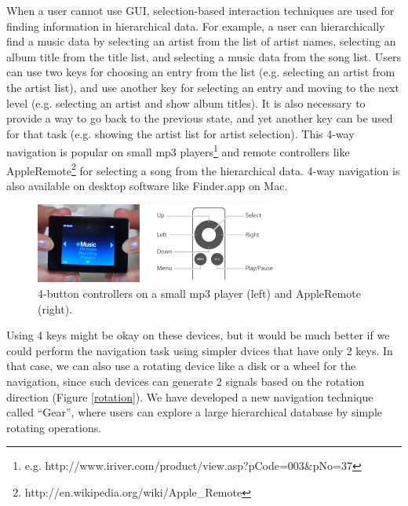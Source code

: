 \documentclass{article}
\begin{document}
When a user cannot use GUI,
selection-based interaction techniques are used for
finding information in hierarchical data.
For example, a user can hierarchically find a music data by
selecting an artist from the list of artist names,
selecting an album title from the title list,
and selecting a music data from the song list.
Users can use two keys for choosing an entry from the list
(e.g. selecting an artist from the artist list),
and use another key for selecting an entry and moving to the next level
(e.g. selecting an artist and show album titles).
It is also necessary to provide a way to go back to the previous state, and
yet another key can be used for that task
(e.g. showing the artist list for artist selection).
This 4-way navigation is popular on small mp3 players\footnote{
  e.g. \textsf{http://www.iriver.com/product/view.asp?pCode=003\&pNo=37}
} and remote controllers like AppleRemote\footnote{\textsf{http://en.wikipedia.org/wiki/Apple\_Remote}}
for selecting a song from the hierarchical data.
4-way navigation is also available on desktop software like Finder.app on Mac.


\begin{figure}[H]
\centerline{\includegraphics[width=80mm,bb=0 0 547 179]{figures/4buttons.png}}
\caption{4-button controllers on a small mp3 player (left) and AppleRemote (right).}
\label{u10}
\end{figure}



Using 4 keys might be okay on these devices, but it would be much better
if we could perform the navigation task using simpler dvices that have only 2 keys.
In that case, we can also use a rotating device like a disk or a wheel for the navigation,
since such devices can generate 2 signals based on the rotation direction (Figure \ref{rotation}).
%
%
We have developed a new navigation technique called ``{Gear}'',
where users can explore a large hierarchical database by simple rotating operations.
\end{document}
